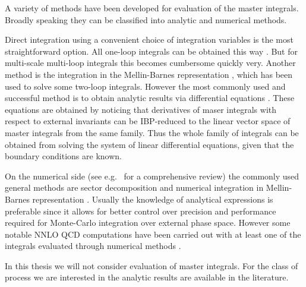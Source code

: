 
A variety of methods have been developed for evaluation of the master integrals.
Broadly speaking they can be classified into analytic and numerical methods.

Direct integration using a convenient choice of integration variables is the most straightforward option.
All one-loop integrals can be obtained this way \cite{vanHameren:2010cp,Ellis:2007qk,tHooft:1978jhc,Denner:2010tr}.
But for multi-scale multi-loop integrals this becomes  cumbersome quickly  very.
Another method is the integration in the Mellin-Barnes  representation  \cite{Smirnov:1999gc,Tausk:1999vh,Dubovyk:2017cqw}, which
has been used to solve some two-loop integrals.
However the most commonly used and successful method is to obtain analytic results via
differential equations \cite{Kotikov:1990kg,Remiddi:1997ny,Gehrmann:1999as,Henn:2013pwa,Argeri:2007up,Henn:2014qga}.
These equations are obtained by noticing that
derivatives of maser integrals with respect to
external invariants can be IBP-reduced to the linear vector space of master integrals from the same family.
Thus the whole family of integrals can be obtained from solving the system of linear differential equations,
given that the boundary conditions are known.

On the numerical side (see e.g.\ \cite{Freitas:2016sty} for a comprehensive review)
the commonly used general methods are sector decomposition \cite{Binoth:2000ps,Binoth:2003ak}
and numerical integration in Mellin-Barnes representation \cite{Czakon:2005rk,Anastasiou:2005cb}.
Usually the knowledge of analytical expressions is preferable since it allows for better control over
precision and performance required for Monte-Carlo integration over external phase space. However
some notable NNLO QCD computations have been carried out with at least one of the integrals evaluated through numerical
methods .

In this thesis we will not consider evaluation of master integrals.
For the class of process we are interested in the analytic results are available in the literature.

